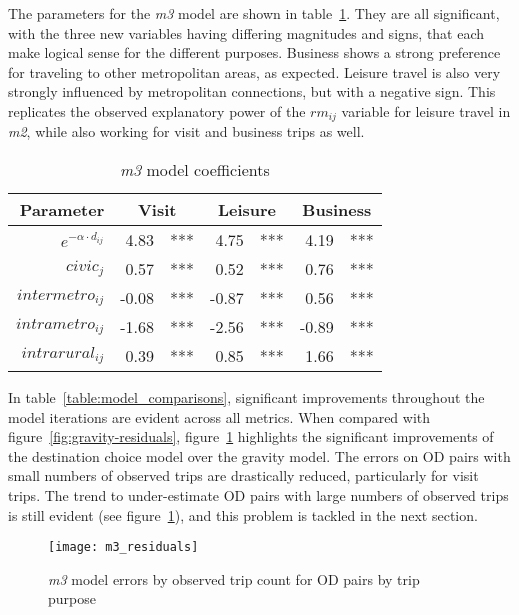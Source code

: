 The parameters for the \textit{m3} model are shown in table~\ref{table:m3-coeff}. They are all significant, with the three new variables having differing magnitudes and signs, that each make logical sense for the different purposes. Business shows a strong preference for traveling to other metropolitan areas, as expected. Leisure travel is also very strongly influenced by metropolitan connections, but with a negative sign. This replicates the observed explanatory power of the $rm_{ij}$ variable for leisure travel in \textit{m2}, while also working for visit and business trips as well.


\begin{table}[H]
\centering
\caption{\textit{m3} model coefficients}
\label{table:m3-coeff}
\begin{tabular}{@{}rrlrlrl@{}}
  \toprule
 Parameter & \multicolumn{2}{c}{Visit} & \multicolumn{2}{c}{Leisure} & \multicolumn{2}{c}{Business} \\ \midrule
  $e^{-\alpha \cdot d_{ij}}$ 	& 4.83 & *** & 4.75 & *** & 4.19 & *** \\  
  $civic_j$ & 0.57 & *** & 0.52 & *** & 0.76 & *** \\ 
  $intermetro_{ij}$ & -0.08 & *** & -0.87 & *** & 0.56 & *** \\ 
  $intrametro_{ij}$ & -1.68 & *** & -2.56 & *** & -0.89 & *** \\  
  $intrarural_{ij}$ & 0.39 & *** & 0.85 & *** & 1.66 & *** \\ 
   \bottomrule
\end{tabular}
\end{table}

In table~\ref{table:model_comparisons}, significant improvements throughout the model iterations are evident across all metrics. When compared with figure~\ref{fig:gravity-residuals}, figure~\ref{fig:m3_residuals} highlights the significant improvements of the destination choice model over the gravity model. The errors on OD pairs with small numbers of observed trips are drastically reduced, particularly for visit trips. The trend to under-estimate OD pairs with large numbers of observed trips is still evident (see figure~\ref{fig:m3_residuals}), and this problem is tackled in the next section. 


\begin{figure}[H]
\centering
\texttt{[image: m3\_residuals]}
\caption{\textit{m3} model errors by observed trip count for OD pairs by trip purpose}
\label{fig:m3_residuals}
\end{figure}


